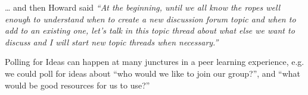 \ldots{} and then Howard said \emph{``At the beginning,
until we all know the ropes well enough to understand when to create a
new discussion forum topic and when to add to an existing one, let's
talk in this topic thread about what else we want to discuss and I
will start new topic threads when necessary.''}

Polling for Ideas can happen at many junctures in a peer learning
experience, e.g. we could poll for ideas about ``who would we like to
join our group?'', and ``what would be good resources for us to use?''

